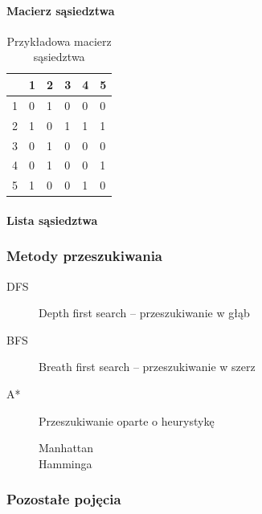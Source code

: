 \documentclass{classrep}
\begin{document}
\paragraph{Macierz sąsiedztwa}
\begin{table}[h!]
    \begin{tabular}{|l|lllll}
    \hline
     & \multicolumn{1}{l|}{1} & \multicolumn{1}{l|}{2} & \multicolumn{1}{l|}{3} & \multicolumn{1}{l|}{4} & \multicolumn{1}{l|}{5} \\ \hline
    1 & 0 & 1 & 0 & 0 & 0 \\ \cline{1-1}
    2 & 1 & 0 & 1 & 1 & 1 \\ \cline{1-1}
    3 & 0 & 1 & 0 & 0 & 0 \\ \cline{1-1}
    4 & 0 & 1 & 0 & 0 & 1 \\ \cline{1-1}
    5 & 1 & 0 & 0 & 1 & 0 \\ \cline{1-1}
    \end{tabular}
    \caption{Przykładowa macierz sąsiedztwa}
    \label{my-label}
    \end{table}

 \paragraph{Lista sąsiedztwa}

\subsubsection{Metody przeszukiwania}
\begin{description}
    \item [DFS] Depth first search -- przeszukiwanie w głąb
    \item [BFS] Breath first search -- przeszukiwanie w szerz
    \item [A*] Przeszukiwanie oparte o heurystykę
    \begin{description}
        \item [Manhattan]
        \item [Hamminga]
    \end{description}
\end{description}

\subsubsection{Pozostałe pojęcia}
\begin{description}
    \item [Cykl]
    \item [Droga]
    \item 
\end{description}
\end{document}
